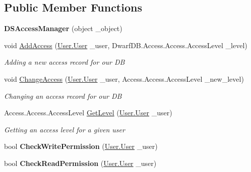 \subsection*{Public Member Functions}
\begin{DoxyCompactItemize}
\item 
\hypertarget{class_dwarf_d_b_1_1_data_structures_1_1_d_s_access_manager_adff83f4ebe6889741a2cfae89cfb0b0c}{{\bfseries D\+S\+Access\+Manager} (object \+\_\+object)}\label{class_dwarf_d_b_1_1_data_structures_1_1_d_s_access_manager_adff83f4ebe6889741a2cfae89cfb0b0c}

\item 
void \hyperlink{class_dwarf_d_b_1_1_data_structures_1_1_d_s_access_manager_aea02ec1b0fac076177a798c71701178e}{Add\+Access} (\hyperlink{class_dwarf_d_b_1_1_user_1_1_user}{User.\+User} \+\_\+user, Dwarf\+D\+B.\+Access.\+Access.\+Access\+Level \+\_\+level)
\begin{DoxyCompactList}\small\item\em Adding a new access record for our D\+B \end{DoxyCompactList}\item 
void \hyperlink{class_dwarf_d_b_1_1_data_structures_1_1_d_s_access_manager_a1ea0d79dfc5488151f97fce43d384797}{Change\+Access} (\hyperlink{class_dwarf_d_b_1_1_user_1_1_user}{User.\+User} \+\_\+user, Access.\+Access.\+Access\+Level \+\_\+new\+\_\+level)
\begin{DoxyCompactList}\small\item\em Changing an access record for our D\+B \end{DoxyCompactList}\item 
Access.\+Access.\+Access\+Level \hyperlink{class_dwarf_d_b_1_1_data_structures_1_1_d_s_access_manager_a96628d21bb3399f062c1416374a63b8c}{Get\+Level} (\hyperlink{class_dwarf_d_b_1_1_user_1_1_user}{User.\+User} \+\_\+user)
\begin{DoxyCompactList}\small\item\em Getting an access level for a given user \end{DoxyCompactList}\item 
\hypertarget{class_dwarf_d_b_1_1_data_structures_1_1_d_s_access_manager_a9e129b021f25e5730c1226f65380275b}{bool {\bfseries Check\+Write\+Permission} (\hyperlink{class_dwarf_d_b_1_1_user_1_1_user}{User.\+User} \+\_\+user)}\label{class_dwarf_d_b_1_1_data_structures_1_1_d_s_access_manager_a9e129b021f25e5730c1226f65380275b}

\item 
\hypertarget{class_dwarf_d_b_1_1_data_structures_1_1_d_s_access_manager_acf7bf4804f9fc0883bd941751b1b7bbc}{bool {\bfseries Check\+Read\+Permission} (\hyperlink{class_dwarf_d_b_1_1_user_1_1_user}{User.\+User} \+\_\+user)}\label{class_dwarf_d_b_1_1_data_structures_1_1_d_s_access_manager_acf7bf4804f9fc0883bd941751b1b7bbc}


\end{DoxyCompactItemize}
